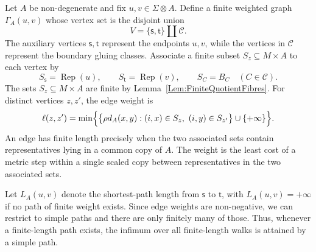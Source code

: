 \documentclass{sn-jnl}%
\theoremstyle{thmstyleone}%
\theoremstyle{thmstyletwo}%
\theoremstyle{thmstylethree}%
\newcommand{\M}{\Sigma}
\newcommand{\F}{\M\otimes}
\begin{document}
Let $A$ be non-degenerate and fix $u,v\in\F A$.  Define a finite weighted graph $\Gamma_A(u,v)$ whose vertex set is the disjoint union
\begin{equation} \nonumber
   V=\{\mathsf s,\mathsf t\}\amalg\mathcal C.
\end{equation}
The auxiliary vertices $\mathsf s,\mathsf t$ represent the endpoints $u,v$, while the vertices in $\mathcal C$ represent the boundary gluing classes. Associate a finite subset $S_z\subseteq M \times A$ to each vertex by
\begin{equation} 
\nonumber
  S_{\mathsf s}=\operatorname{Rep}(u),   \qquad   S_{\mathsf t} =\operatorname{Rep}(v),   \qquad   S_C=B_C\quad(C\in\mathcal C).
\end{equation}
The sets $S_z\subseteq M\times A$ are finite by Lemma~\ref{Lem:FiniteQuotientFibres}. For distinct vertices $z,z'$, the edge weight is
\begin{equation}
    \ell(z,z')=  \min\Bigl\{   \bigl\{\rho d_A(x,y): (i,x)\in S_z,\ (i,y)\in S_{z'} \bigr\}\cup\{+\infty\}  \Bigr\}.
\label{eqn:edge Weight}
\end{equation}
An edge has finite length precisely when the two associated sets contain representatives lying in a common copy of $A$. The weight is the least cost of a metric step within a single scaled copy between representatives in the two associated sets. 

Let $L_A(u,v)$ denote the shortest-path length from $\mathsf s$ to $\mathsf t$, with $L_A(u,v)=+\infty$ if no path of finite weight exists. Since edge weights are non-negative, we can restrict to simple paths and there are only finitely many of those. Thus, whenever a finite-length path exists, the infimum over all finite-length walks is attained by a simple path.
\end{document}
